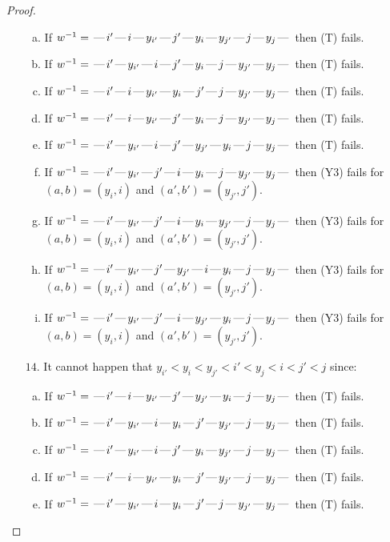 \documentclass[10pt]{article}
\theoremstyle{definition}
\theoremstyle{definition}
\def\dash{\text{\hspace{0.5mm}---\hspace{0.5mm}}}
\begin{document}
\begin{proof}
\begin{enumerate}
\begin{enumerate}[(a)]
\item If $w^{-1} = \dash i'\dash i\dash y_{i'}\dash j'\dash y_i\dash y_{j'}\dash j\dash y_j\dash $ then (T) fails.
\item If $w^{-1} = \dash i'\dash y_{i'}\dash i\dash j'\dash y_i\dash j\dash y_{j'}\dash y_j\dash $ then (T) fails.
\item If $w^{-1} = \dash i'\dash i\dash y_{i'}\dash y_i\dash j'\dash j\dash y_{j'}\dash y_j\dash $ then (T) fails.
\item If $w^{-1} = \dash i'\dash i\dash y_{i'}\dash j'\dash y_i\dash j\dash y_{j'}\dash y_j\dash $ then (T) fails.
\item If $w^{-1} = \dash i'\dash y_{i'}\dash i\dash j'\dash y_{j'}\dash y_i\dash j\dash y_j\dash $ then (T) fails.
\item If $w^{-1} = \dash i'\dash y_{i'}\dash j'\dash i\dash y_i\dash j\dash y_{j'}\dash y_j\dash $ then (Y3) fails for $(a,b)=(y_i,i)$ and $(a',b')=(y_{j'},j')$.
\item If $w^{-1} = \dash i'\dash y_{i'}\dash j'\dash i\dash y_i\dash y_{j'}\dash j\dash y_j\dash $ then (Y3) fails for $(a,b)=(y_i,i)$ and $(a',b')=(y_{j'},j')$.
\item If $w^{-1} = \dash i'\dash y_{i'}\dash j'\dash y_{j'}\dash i\dash y_i\dash j\dash y_j\dash $ then (Y3) fails for $(a,b)=(y_i,i)$ and $(a',b')=(y_{j'},j')$.
\item If $w^{-1} = \dash i'\dash y_{i'}\dash j'\dash i\dash y_{j'}\dash y_i\dash j\dash y_j\dash $ then (Y3) fails for $(a,b)=(y_i,i)$ and $(a',b')=(y_{j'},j')$.
\end{enumerate}
\item[$14$.] It cannot happen that $y_{i'} < y_i < y_{j'} < i' < y_j < i < j' < j$ since:
\begin{enumerate}[(a)]
\item If $w^{-1} = \dash i'\dash i\dash y_{i'}\dash j'\dash y_{j'}\dash y_i\dash j\dash y_j\dash $ then (T) fails.
\item If $w^{-1} = \dash i'\dash y_{i'}\dash i\dash y_i\dash j'\dash y_{j'}\dash j\dash y_j\dash $ then (T) fails.
\item If $w^{-1} = \dash i'\dash y_{i'}\dash i\dash j'\dash y_i\dash y_{j'}\dash j\dash y_j\dash $ then (T) fails.
\item If $w^{-1} = \dash i'\dash i\dash y_{i'}\dash y_i\dash j'\dash y_{j'}\dash j\dash y_j\dash $ then (T) fails.
\item If $w^{-1} = \dash i'\dash y_{i'}\dash i\dash y_i\dash j'\dash j\dash y_{j'}\dash y_j\dash $ then (T) fails.

\end{enumerate}
\end{enumerate}
\end{proof}
\end{document}
